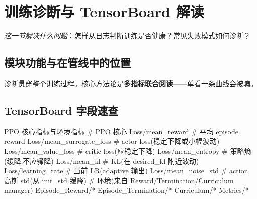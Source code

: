 \section{训练诊断与 TensorBoard 解读}
\label{sec:rlmc-train-diag}

\emph{这一节解决什么问题}：怎样从日志判断训练是否健康？常见失败模式如何诊断？

\subsection{模块功能与在管线中的位置}

诊断贯穿整个训练过程。核心方法论是\textbf{多指标联合阅读}——单看一条曲线会被骗。

\subsection{TensorBoard 字段速查}

\begin{codebox}[text]{PPO 核心指标与环境指标}
# PPO 核心
Loss/mean_reward          # 平均 episode reward
Loss/mean_surrogate_loss  # actor loss(稳定下降或小幅波动)
Loss/mean_value_loss      # critic loss(应稳定下降)
Loss/mean_entropy         # 策略熵(缓降,不应骤降)
Loss/mean_kl              # KL(在 desired_kl 附近波动)
Loss/learning_rate        # 当前 LR(adaptive 输出)
Loss/mean_noise_std       # action 高斯 std(从 init_std 缓降)
# 环境(来自 Reward/Termination/Curriculum manager)
Episode_Reward/*  Episode_Termination/*  Curriculum/*  Metrics/*
\end{codebox}

